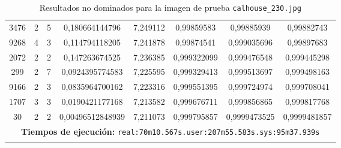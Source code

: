 \begin{longtable}{|c|c|c|c|c|c|c|c|}
3476 & 2 & 5 & 0,180664144796 & 7,249112 & 0,99859583 & 0,99885939 & 0,99882743 \\
9268 & 4 & 3 & 0,114794118205 & 7,241878 & 0,99874541 & 0,999035696 & 0,99897683 \\
2072 & 2 & 2 & 0,147263674525 & 7,236385 & 0,999322099 & 0,999476548 & 0,999445298 \\
299 & 2 & 7 & 0,0924395774583 & 7,225595 & 0,999329413 & 0,999513697 & 0,999498163 \\
9166 & 2 & 3 & 0,0835964700162 & 7,223316 & 0,999551395 & 0,999724974 & 0,999708041 \\
1707 & 3 & 3 & 0,0190421177168 & 7,213582 & 0,999676711 & 0,999856865 & 0,999817768 \\
30 & 2 & 2 & 0,00496512848939 & 7,211073 & 0,999795857 & 0,9999473525 & 0,9999481857 \\
\hline
\multicolumn{8}{|c|}{\textbf{Tiempos de ejecución:} \texttt{real:70m10.567s.user:207m55.583s.sys:95m37.939s}}\\ \hline
\caption{Resultados no dominados para la imagen de prueba \texttt{calhouse\_230.jpg}}
\label{tab:calhouse_230}
\end{longtable}
\normalsize

